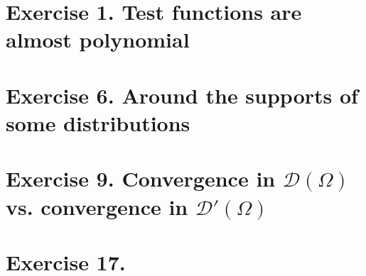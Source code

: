 \section{Exercise 1. Test functions are almost polynomial}

\setcounter{section}{5} 
\section{Exercise 6. Around the supports of some distributions}

\setcounter{section}{8} 
\section{Exercise 9. Convergence in $\mathscr{D}(\Omega)\,$ vs. convergence in $\mathscr{D}'(\Omega)\,$}

\setcounter{section}{16} 
\section{Exercise 17. }


